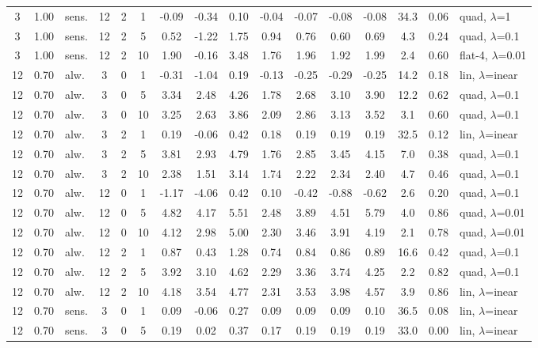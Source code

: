 \begin{scriptsize}
\begin{longtable}{cclcc c ccc ccc c cc l}
3 & 1.00 & sens. & 12 & 2 & 1 & -0.09 & -0.34 & 0.10 & -0.04 & -0.07 & -0.08 & -0.08 & 34.3 & 0.06 & quad, $\lambda$=1 \\
3 & 1.00 & sens. & 12 & 2 & 5 & 0.52 & -1.22 & 1.75 & 0.94 & 0.76 & 0.60 & 0.69 & 4.3 & 0.24 & quad, $\lambda$=0.1 \\
3 & 1.00 & sens. & 12 & 2 & 10 & 1.90 & -0.16 & 3.48 & 1.76 & 1.96 & 1.92 & 1.99 & 2.4 & 0.60 & flat-4, $\lambda$=0.01 \\
12 & 0.70 & alw. & 3 & 0 & 1 & -0.31 & -1.04 & 0.19 & -0.13 & -0.25 & -0.29 & -0.25 & 14.2 & 0.18 & lin, $\lambda$=inear \\
12 & 0.70 & alw. & 3 & 0 & 5 & 3.34 & 2.48 & 4.26 & 1.78 & 2.68 & 3.10 & 3.90 & 12.2 & 0.62 & quad, $\lambda$=0.1 \\
12 & 0.70 & alw. & 3 & 0 & 10 & 3.25 & 2.63 & 3.86 & 2.09 & 2.86 & 3.13 & 3.52 & 3.1 & 0.60 & quad, $\lambda$=0.1 \\
12 & 0.70 & alw. & 3 & 2 & 1 & 0.19 & -0.06 & 0.42 & 0.18 & 0.19 & 0.19 & 0.19 & 32.5 & 0.12 & lin, $\lambda$=inear \\
12 & 0.70 & alw. & 3 & 2 & 5 & 3.81 & 2.93 & 4.79 & 1.76 & 2.85 & 3.45 & 4.15 & 7.0 & 0.38 & quad, $\lambda$=0.1 \\
12 & 0.70 & alw. & 3 & 2 & 10 & 2.38 & 1.51 & 3.14 & 1.74 & 2.22 & 2.34 & 2.40 & 4.7 & 0.46 & quad, $\lambda$=0.1 \\
12 & 0.70 & alw. & 12 & 0 & 1 & -1.17 & -4.06 & 0.42 & 0.10 & -0.42 & -0.88 & -0.62 & 2.6 & 0.20 & quad, $\lambda$=0.1 \\
12 & 0.70 & alw. & 12 & 0 & 5 & 4.82 & 4.17 & 5.51 & 2.48 & 3.89 & 4.51 & 5.79 & 4.0 & 0.86 & quad, $\lambda$=0.01 \\
12 & 0.70 & alw. & 12 & 0 & 10 & 4.12 & 2.98 & 5.00 & 2.30 & 3.46 & 3.91 & 4.19 & 2.1 & 0.78 & quad, $\lambda$=0.01 \\
12 & 0.70 & alw. & 12 & 2 & 1 & 0.87 & 0.43 & 1.28 & 0.74 & 0.84 & 0.86 & 0.89 & 16.6 & 0.42 & quad, $\lambda$=0.1 \\
12 & 0.70 & alw. & 12 & 2 & 5 & 3.92 & 3.10 & 4.62 & 2.29 & 3.36 & 3.74 & 4.25 & 2.2 & 0.82 & quad, $\lambda$=0.1 \\
12 & 0.70 & alw. & 12 & 2 & 10 & 4.18 & 3.54 & 4.77 & 2.31 & 3.53 & 3.98 & 4.57 & 3.9 & 0.86 & lin, $\lambda$=inear \\
12 & 0.70 & sens. & 3 & 0 & 1 & 0.09 & -0.06 & 0.27 & 0.09 & 0.09 & 0.09 & 0.10 & 36.5 & 0.08 & lin, $\lambda$=inear \\
12 & 0.70 & sens. & 3 & 0 & 5 & 0.19 & 0.02 & 0.37 & 0.17 & 0.19 & 0.19 & 0.19 & 33.0 & 0.00 & lin, $\lambda$=inear \\

\end{longtable}
\end{scriptsize}
